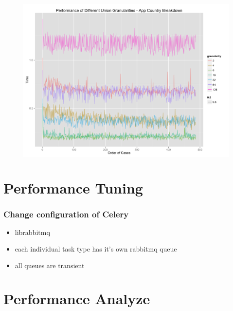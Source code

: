 \documentclass{beamer}
\begin{document}
\begin{frame}
\begin{figure}
\includegraphics[width=\linewidth]{images/union_granularity.png}
\end{figure}
\end{frame}

\section{Performance Tuning}
\begin{frame}
\frametitle{Change configuration of Celery}
\begin{itemize}
\item librabbitmq
\item each individual task type has it's own rabbitmq queue
\item all queues are transient
\end{itemize}
\end{frame}

\section{Performance Analyze}
\end{document}
